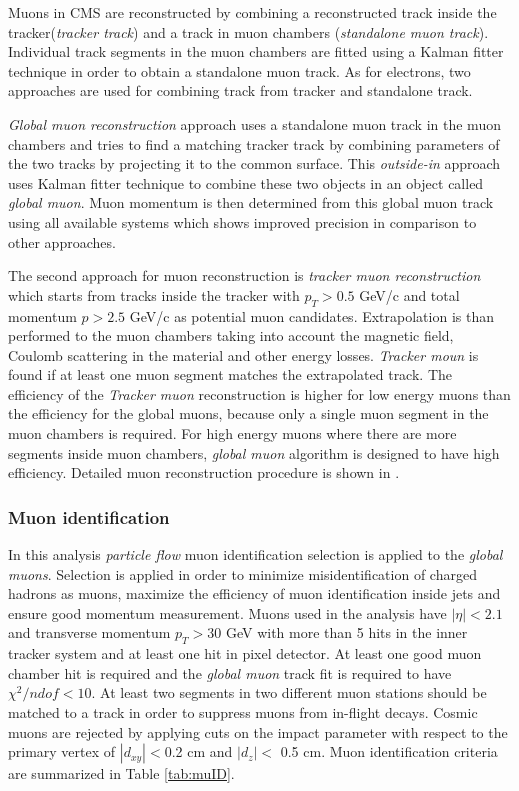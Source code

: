 Muons in CMS are reconstructed by combining a reconstructed track inside the tracker(\textit{tracker track}) and a track in muon chambers (\textit{standalone muon track}). Individual track segments in the muon chambers are fitted using a Kalman fitter technique \cite{Fruhwirth1987444}  in order to obtain a standalone muon track. As for electrons, two approaches are used for combining track from tracker and standalone track. 
\par \textit{Global muon reconstruction} approach uses a standalone muon track in the muon chambers and tries to find a matching tracker track by combining parameters of the two tracks by projecting it to the common surface. This \textit{outside-in} approach uses Kalman fitter technique to combine these two objects in an object called \textit{global muon}. Muon momentum is then determined from this global muon track using all available systems which shows improved precision in comparison to other approaches.  
\par The second approach for muon reconstruction is \textit{tracker muon reconstruction} which starts from tracks inside the tracker with $p_T>0.5$ GeV/c and total momentum $p>2.5$ GeV/c as potential muon candidates. Extrapolation is than performed to the muon chambers taking into account the magnetic field, Coulomb scattering in the material and other energy losses. \textit{Tracker moun} is found if at least one muon segment matches the extrapolated track. The efficiency of the \textit{Tracker muon} reconstruction is higher for low energy muons than the efficiency for the global muons, because only a single muon segment in the muon chambers is required. For high energy muons where there are more segments inside muon chambers, \textit{global muon} algorithm is designed to have high efficiency. Detailed muon reconstruction procedure is shown in \cite{2012JInst7P0002T}.    


\subsubsection*{Muon identification}
\label{sec:muID}

In this analysis \textit{particle flow} muon identification selection is applied to the \textit{global muons}. Selection is applied in order to minimize misidentification of charged hadrons as muons, maximize the efficiency of muon identification inside jets and ensure good momentum measurement. Muons used in the analysis have $|\eta|<2.1$ and transverse momentum $p_T>30$ GeV with more than 5 hits in the inner tracker system and at least one hit in pixel detector. At least one good muon chamber hit is required and the \textit{global muon} track fit is required to have $\chi^2/ndof<10$. At least two segments in two different muon stations should be matched to a track in order to suppress muons from in-flight decays. Cosmic muons are rejected by applying cuts on the impact parameter with respect to the primary vertex of $|d_{xy}|<$0.2 cm and $|d_z|<$ 0.5 cm. Muon identification criteria are summarized in Table \ref{tab:muID}.


